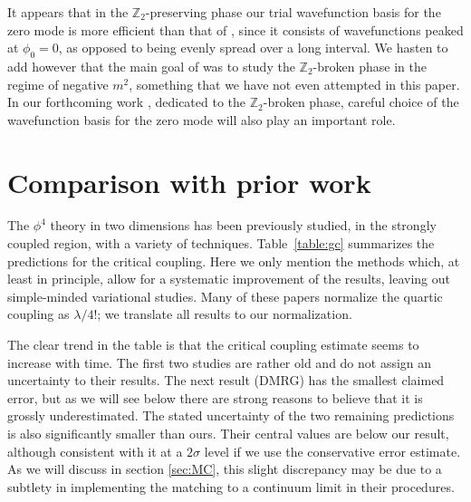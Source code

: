 \documentclass[11pt]{article}
\def\bZ {\mathbb{Z}}
\def\bZ {\mathbb{Z}}
\numberwithin{equation}{section}
\begin{document}
It appears that in the $\bZ_2$-preserving phase our trial wavefunction basis for the zero mode is more efficient than that of \cite{Coser:2014lla}, since it consists of wavefunctions peaked at $\phi_0=0$, as opposed to being evenly spread over a long interval.
We hasten to add however that the main goal of \cite{Coser:2014lla} was to study the $\bZ_2$-broken phase in the regime of negative $m^2$, something that we have not even attempted in this paper. In our forthcoming work \cite{Rychkov:2015vap}, dedicated to the $\bZ_2$-broken phase, careful choice of the wavefunction basis for the zero mode will also play an important role.

\section{Comparison with prior work}
\label{sec:priorwork}

The $\phi^4$ theory in two dimensions has been previously studied, in the strongly coupled region, with a variety of techniques. Table~\ref{table:gc} summarizes the predictions for the critical coupling. Here we only mention the methods which, at least in principle, allow for a systematic improvement of the results, leaving out simple-minded variational studies. Many of these papers normalize the quartic coupling as $\lambda/4!$; we translate all results to our normalization.

The clear trend in the table is that the critical coupling estimate seems to increase with time. The first two studies are rather old and do not assign an uncertainty to their results. The next result (DMRG) has the smallest claimed error, but as we will see below there are strong reasons to believe that it is grossly underestimated. The stated uncertainty of the two remaining predictions is also significantly smaller than ours. 
Their central values are below our result, although consistent with it at a $2\sigma$ level if we use the conservative error estimate. 
As we will discuss in section \ref{sec:MC}, this slight discrepancy may be due to a subtlety in implementing the matching to a continuum limit in their procedures.
\end{document}
